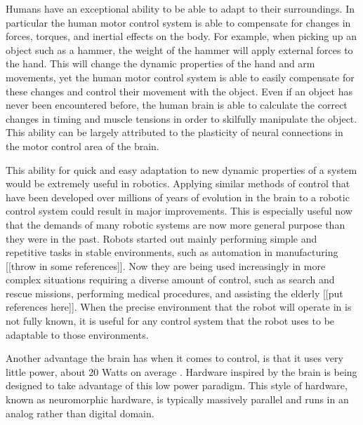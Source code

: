 \documentclass[letterpaper,12pt,titlepage,oneside,final]{book}
\begin{document}
Humans have an exceptional ability to be able to adapt to their surroundings.
In particular the human motor control system is able to compensate for changes in forces, torques, and inertial effects on the body.
For example, when picking up an object such as a hammer, the weight of the hammer will apply external forces to the hand.
This will change the dynamic properties of the hand and arm movements, yet the human motor control system is able to easily compensate for these changes and control their movement with the object.
Even if an object has never been encountered before, the human brain is able to calculate the correct changes in timing and muscle tensions in order to skilfully manipulate the object. %
This ability can be largely attributed to the plasticity of neural connections in the motor control area of the brain.

This ability for quick and easy adaptation to new dynamic properties of a system would be extremely useful in robotics. 
Applying similar methods of control that have been developed over millions of years of evolution in the brain to a robotic control system could result in major improvements. 
This is especially useful now that the demands of many robotic systems are now more general purpose than they were in the past. 
Robots started out mainly performing simple and repetitive tasks in stable environments, such as automation in manufacturing [[throw in some references]]. 
Now they are being used increasingly in more complex situations requiring a diverse amount of control, such as search and rescue missions, performing medical procedures, and assisting the elderly [[put references here]]. 
When the precise environment that the robot will operate in is not fully known, it is useful for any control system that the robot uses to be adaptable to those environments.

Another advantage the brain has when it comes to control, is that it uses very little power, about 20 Watts on average \cite{hart1975brain}.
Hardware inspired by the brain is being designed to take advantage of this low power paradigm. 
This style of hardware, known as neuromorphic hardware, is typically massively parallel and runs in an analog rather than digital domain.
\end{document}
